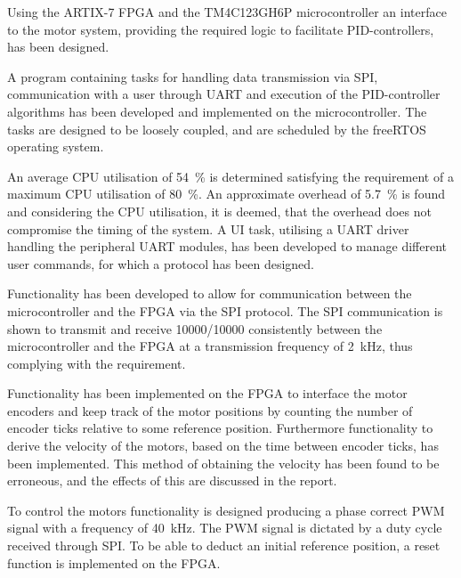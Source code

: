 \documentclass[../../main.tex]{subfiles}
\begin{document}

Using the ARTIX-7 FPGA and the TM4C123GH6P microcontroller an interface to the motor system, providing the required logic to facilitate PID-controllers, has been designed. 

A program containing tasks for handling data transmission via SPI, communication with a user through UART and execution of the PID-controller algorithms has been developed and implemented on the microcontroller. The tasks are designed to be loosely coupled, and are scheduled by the freeRTOS operating system.

An average CPU utilisation of \SI{54}{\percent} is determined satisfying the requirement of a maximum CPU utilisation of \SI{80}{\percent}. An approximate overhead of \SI{5,7}{\percent} is found and considering the CPU utilisation, it is deemed, that the overhead does not compromise the timing of the system. A UI task, utilising a UART driver handling the peripheral UART modules, has been developed to manage different user commands, for which a protocol has been designed.

Functionality has been developed to allow for communication between the microcontroller and the FPGA via the SPI protocol. The SPI communication is shown to transmit and receive 10000/10000 consistently between the microcontroller and the FPGA at a transmission frequency of \SI{2}{\kilo\hertz}, thus complying with the requirement.

Functionality has been implemented on the FPGA to interface the motor encoders and keep track of the motor positions by counting the number of encoder ticks relative to some reference position. Furthermore functionality to derive the velocity of the motors, based on the time between encoder ticks, has been implemented. This method of obtaining the velocity has been found to be erroneous, and the effects of this are discussed in the report. 

To control the motors functionality is designed producing a phase correct PWM signal with a frequency of \SI{40}{\kilo\hertz}. The PWM signal is dictated by a duty cycle received through SPI. To be able to deduct an initial reference position, a reset function is implemented on the FPGA.
\end{document}
